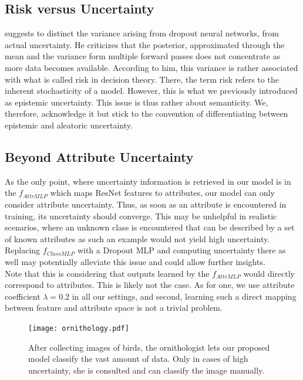 \documentclass[a4paper,cleardoubleempty,BCOR1cm, 11pt]{report}
\begin{document}
\subsection{Risk versus Uncertainty}
\citet{osband2016risk} suggests to distinct the variance arising from dropout neural networks, from actual uncertainty. He  criticizes that the posterior, approximated through the mean and the variance form multiple forward passes does not concentrate as more data becomes available. According to him, this variance is rather associated with what is called risk in decision theory. There, the term risk refers to the inherent stochasticity of a model. However, this is what we previously introduced as epistemic uncertainty. This issue is thus rather about semanticity. We, therefore, acknowledge it but stick to the convention of differentiating between epistemic and aleatoric uncertainty.


\subsection{Beyond Attribute Uncertainty}\label{sec:attr_uncertainty}
As the only point, where uncertainty information is retrieved in our model is in the $f_{AttrMLP}$ which maps ResNet features to attributes, our model can only consider attribute uncertainty. Thus, as soon as an attribute is encountered in training, its uncertainty should converge. This may be unhelpful in realistic scenarios, where an unknown class is encountered that can be described by a set of known attributes as such an example would not yield high uncertainty. Replacing $f_{ClassMLP}$ with a Dropout MLP and computing uncertainty there as well may potentially alleviate this issue and could allow further insights.\\
Note that this is considering that outputs learned by the $f_{AttrMLP}$ would directly correspond to attributes. This is likely not the case. As for one, we use attribute coefficient $\lambda=0.2$ in all our settings, and second, learning such a direct mapping between feature and attribute space is not a trivial problem. %


\begin{figure}[t]
	\centering
	\texttt{[image: ornithology.pdf]}
	\caption[caption for ]{After collecting images of birds, the ornithologist lets our proposed model classify the vast amount of data. Only in cases of high uncertainty, she is consulted and can classify the image manually. \footnotemark}
	\label{fig:qual}
\end{figure}
\end{document}
